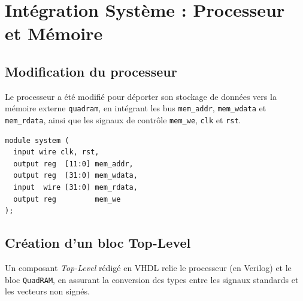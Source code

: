 \section{Intégration Système : Processeur et Mémoire}

\subsection{Modification du processeur}

Le processeur a été modifié pour déporter son stockage de données vers la mémoire externe \texttt{quadram}, en intégrant les bus \texttt{mem\_addr}, \texttt{mem\_wdata} et \texttt{mem\_rdata}, ainsi que les signaux de contrôle \texttt{mem\_we}, \texttt{clk} et \texttt{rst}.

\begin{lstlisting}[caption={Interface externe du processeur}, label={lst:processor_ram}]
module system (
  input wire clk, rst,
  output reg  [11:0] mem_addr,
  output reg  [31:0] mem_wdata,
  input  wire [31:0] mem_rdata,
  output reg         mem_we
);
\end{lstlisting}

\subsection{Création d'un bloc Top-Level}

Un composant \textit{Top-Level} rédigé en VHDL relie le processeur (en Verilog) et le bloc \texttt{QuadRAM}, en assurant la conversion des types entre les signaux standards et les vecteurs non signés.

